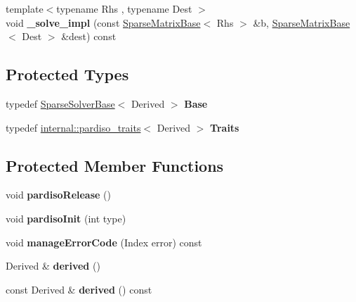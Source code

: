 \begin{DoxyCompactItemize}
\item 
\mbox{\label{class_eigen_1_1_pardiso_impl_a886c757fea6fe1d992a66524213f14fb}} 
{\footnotesize template$<$typename Rhs , typename Dest $>$ }\\void {\bfseries \+\_\+solve\+\_\+impl} (const \mbox{\hyperlink{class_eigen_1_1_sparse_matrix_base}{Sparse\+Matrix\+Base}}$<$ Rhs $>$ \&b, \mbox{\hyperlink{class_eigen_1_1_sparse_matrix_base}{Sparse\+Matrix\+Base}}$<$ Dest $>$ \&dest) const
\end{DoxyCompactItemize}
\subsection*{Protected Types}
\begin{DoxyCompactItemize}
\item 
\mbox{\label{class_eigen_1_1_pardiso_impl_aebf63524acad1cd560a3b293faf4df7e}} 
typedef \mbox{\hyperlink{class_eigen_1_1_sparse_solver_base}{Sparse\+Solver\+Base}}$<$ Derived $>$ {\bfseries Base}
\item 
\mbox{\label{class_eigen_1_1_pardiso_impl_a8a43f20311beb4b0571cb9d0c6703277}} 
typedef \mbox{\hyperlink{struct_eigen_1_1internal_1_1pardiso__traits}{internal\+::pardiso\+\_\+traits}}$<$ Derived $>$ {\bfseries Traits}
\end{DoxyCompactItemize}
\subsection*{Protected Member Functions}
\begin{DoxyCompactItemize}
\item 
\mbox{\label{class_eigen_1_1_pardiso_impl_aa480e5ca316d25bb2b556ed5473ab0de}} 
void {\bfseries pardiso\+Release} ()
\item 
\mbox{\label{class_eigen_1_1_pardiso_impl_a4d13fa79acda71b1164e07d61156462f}} 
void {\bfseries pardiso\+Init} (int type)
\item 
\mbox{\label{class_eigen_1_1_pardiso_impl_ad34dfcda0a66d31a68b12bb8fc28f504}} 
void {\bfseries manage\+Error\+Code} (Index error) const
\item 
\mbox{\label{class_eigen_1_1_pardiso_impl_ad213fb2c2199ca597b96f1f79653637f}} 
Derived \& {\bfseries derived} ()
\item 
\mbox{\label{class_eigen_1_1_pardiso_impl_af5f23a7e048060c3082c5a1ddfa91932}} 
const Derived \& {\bfseries derived} () const
\end{DoxyCompactItemize}
